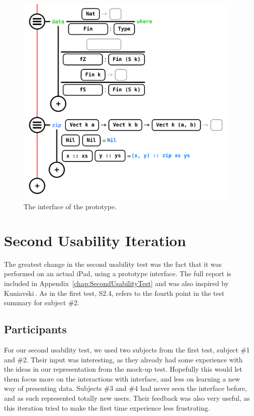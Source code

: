 \begin{figure}
	\centering
		\includegraphics[width=110mm]{diagrams/ipad_interface.PNG}
	\caption{The interface of the prototype.}
\label{fig:initialiPadInterface}
\end{figure}

\section{Second Usability Iteration}
\label{sec:SecondUsabilityTest}
The greatest change in the second usability test was the fact that it was
performed on an actual iPad, using a prototype interface. The full report is
included in Appendix~\ref{chap:SecondUsabilityTest} and was also inspired by Kuniavski\,\cite{kuniavsky2003observing}. As in the first test, S2.4, refers to
the fourth point in the test summary for subject \#2.

\subsection{Participants}
For our second usability test, we used two subjects from the first test,
subject \#1 and \#2. Their input was interesting, as they already had some
experience with the ideas in our representation from the mock-up test.
Hopefully this would let them focus more on the interactions with interface,
and less on learning a new way of presenting data. Subjects \#3 and \#4 had
never seen the interface before, and as such represented totally new users.
Their feedback was also very useful, as this iteration tried to make the first
time experience less frustrating.

